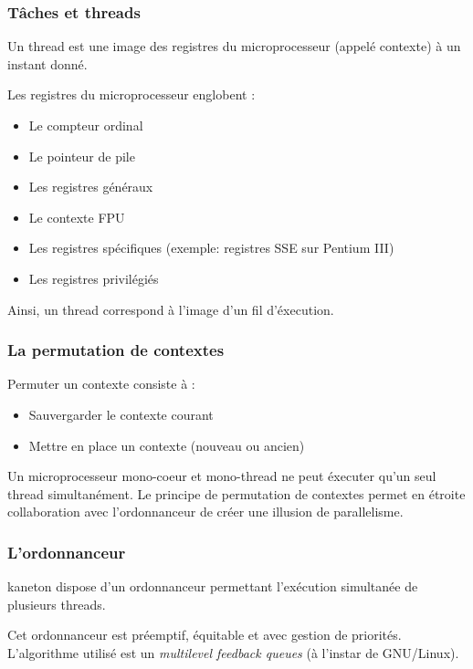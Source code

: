 
\begin{frame}[containsverbatim]
  \frametitle{T\^{a}ches et threads}

  Un thread est une image des registres du microprocesseur (appel\'{e}
  contexte) \`{a} un instant donn\'{e}.

  \-

  Les registres du microprocesseur englobent :

  \begin{itemize}
  \item
    Le compteur ordinal
  \item
    Le pointeur de pile
  \item
    Les registres g\'{e}n\'{e}raux
  \item
    Le contexte FPU
  \item
    Les registres sp\'{e}cifiques (exemple: registres SSE sur Pentium III)
  \item
    Les registres privil\'{e}gi\'{e}s
  \end{itemize}

  \-

  Ainsi, un thread correspond \`{a} l'image d'un fil d'\'{e}xecution.

\end{frame}


\begin{frame}
  \frametitle{La permutation de contextes}

  Permuter un contexte consiste \`{a} :

  \begin{itemize}
  \item
    Sauvergarder le contexte courant
  \item
    Mettre en place un contexte (nouveau ou ancien)
  \end{itemize}

  \-

  Un microprocesseur mono-coeur et mono-thread ne peut \'{e}xecuter
  qu'un seul thread simultan\'{e}ment. Le principe de permutation de
  contextes permet en \'{e}troite collaboration avec l'ordonnanceur de
  cr\'{e}er une illusion de parallelisme.

\end{frame}


\begin{frame}
  \frametitle{L'ordonnanceur}

  kaneton dispose d'un ordonnanceur permettant l'ex\'{e}cution
  simultan\'{e}e de plusieurs threads.

  Cet ordonnanceur est pr\'{e}emptif, \'{e}quitable et avec gestion de
  priorit\'{e}s. L'algorithme utilis\'{e} est un \emph{multilevel
  feedback queues} (\`{a} l'instar de GNU/Linux).

\end{frame}

